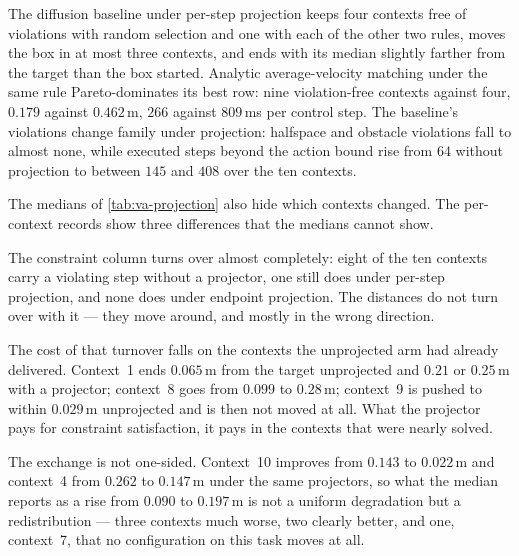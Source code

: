 The diffusion baseline under per-step projection keeps four contexts free of violations with random
selection and one with each of the other two rules, moves the box in at most three contexts, and ends with
its median slightly farther from the target than the box started. Analytic average-velocity matching under
the same rule Pareto-dominates its best row: nine violation-free contexts against four, $0.179$ against $0.462$\,m,
$266$ against $809$\,ms per control step. The baseline's violations change family under projection:
halfspace and obstacle violations fall to almost none, while executed steps beyond the action bound rise
from $64$ without projection to between $145$ and $408$ over the ten contexts.

The medians of \autoref{tab:va-projection} also hide which contexts changed. The per-context records
show three differences that the medians cannot show.

The constraint column turns over almost completely: eight of the ten contexts carry a violating step
without a projector, one still does under per-step projection, and none does under endpoint projection.
The distances do not turn over with it --- they move around, and mostly in the wrong direction.

The cost of that turnover falls on the contexts the unprojected arm had already delivered. Context~1 ends
$0.065$\,m from the target unprojected and $0.21$ or $0.25$\,m with a projector; context~8 goes from
$0.099$ to $0.28$\,m; context~9 is pushed to within $0.029$\,m unprojected and is then not moved at all.
What the projector pays for constraint satisfaction, it pays in the contexts that were nearly solved.

The exchange is not one-sided. Context~10 improves from $0.143$ to $0.022$\,m and context~4 from
$0.262$ to $0.147$\,m under the same projectors, so what the median reports as a rise from $0.090$ to
$0.197$\,m is not a uniform degradation but a redistribution --- three contexts much worse, two clearly
better, and one, context~7, that no configuration on this task moves at all.


